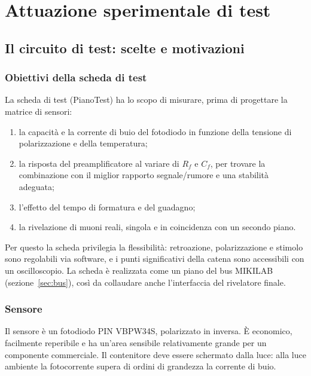 \documentclass[11pt,a4paper]{article}
\begin{document}
\section{Attuazione sperimentale di test}\label{sec:test}

\subsection{Il circuito di test: scelte e motivazioni}

\subsubsection{Obiettivi della scheda di test}

La scheda di test (PianoTest) ha lo scopo di misurare, prima di progettare la matrice di sensori:
\begin{enumerate}
  \item la capacità e la corrente di buio del fotodiodo in funzione della tensione di polarizzazione e della temperatura;
  \item la risposta del preamplificatore al variare di $R_f$ e $C_f$, per trovare la combinazione con il miglior rapporto segnale/rumore e una stabilità adeguata;
  \item l'effetto del tempo di formatura e del guadagno;
  \item la rivelazione di muoni reali, singola e in coincidenza con un secondo piano.
\end{enumerate}
Per questo la scheda privilegia la flessibilità: retroazione, polarizzazione e stimolo sono regolabili via software, e i punti significativi della catena sono accessibili con un oscilloscopio. La scheda è realizzata come un piano del bus MIKILAB (sezione~\ref{sec:bus}), così da collaudare anche l'interfaccia del rivelatore finale.

\subsubsection{Sensore}

Il sensore è un fotodiodo PIN VBPW34S, polarizzato in inversa. È economico, facilmente reperibile e ha un'area sensibile relativamente grande per un componente commerciale. Il contenitore deve essere schermato dalla luce: alla luce ambiente la fotocorrente supera di ordini di grandezza la corrente di buio.
\end{document}
